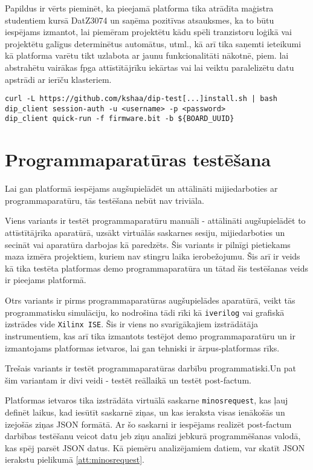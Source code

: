 Papildus ir vērts pieminēt, ka pieejamā platforma tika atrādīta maģistra
studentiem kursā DatZ3074 un saņēma pozitīvas atsauksmes, ka to būtu iespējams
izmantot, lai piemēram projektētu kādu spēli tranzistoru loģikā vai projektētu
galīgus determinētus automātus, utml., kā arī tika saņemti ieteikumi kā
platforma varētu tikt uzlabota ar jaunu funkcionalitāti nākotnē, piem. lai
abstrahētu vairākas \gls{fpga} attīstītājrīku iekārtas vai lai veiktu
paralelizētu datu apstrādi ar ierīču klasteriem. 

\begin{lstlisting}[caption={Platformas klienta lietošanas uzsākšana},label={lst:setup},captionpos=b]
curl -L https://github.com/kshaa/dip-test[...]install.sh | bash
dip_client session-auth -u <username> -p <password>
dip_client quick-run -f firmware.bit -b ${BOARD_UUID}
\end{lstlisting}

\section{Programmaparatūras testēšana}
\label{sec:testing}

Lai gan platformā iespējams augšupielādēt un attālināti mijiedarboties ar
programmaparatūru, tās testēšana nebūt nav triviāla.

Viens variants ir testēt programmaparatūru manuāli - attālināti augšupielādēt to
attīstītājrīka aparatūrā, uzsākt virtuālās saskarnes sesiju, mijiedarboties un
secināt vai aparatūra darbojas kā paredzēts. Šis variants ir pilnīgi pietiekams
maza izmēra projektiem, kuriem nav stingru laika ierobežojumu. Šis arī ir veids
kā tika testēta platformas demo programmaparatūra un tātad šis testēšanas veids
ir pieejams platformā.

Otrs variants ir pirms programmaparatūras augšupielādes aparatūrā, veikt tās
programmatisku simulāciju, ko nodrošina tādi rīki kā \lstinline!iverilog! vai
grafiskā izstrādes vide \lstinline!Xilinx ISE!. Šis ir viens no
svarīgākajiem izstrādātāja instrumentiem, kas arī tika izmantots testējot demo
programmaparatūru un ir izmantojams platformas ietvaros, lai gan tehniski ir
ārpus-platformas rīks.

Trešais variants ir testēt programmaparatūras darbību programmatiski.Un pat šim
variantam ir divi veidi - testēt reāllaikā un testēt post-factum. 

Platformas ietvaros tika izstrādāta virtuālā saskarne \lstinline!minosrequest!,
kas ļauj definēt laikus, kad iesūtīt saskarnē ziņas, un kas ieraksta visas
ienākošās un izejošās ziņas JSON formātā. Ar šo saskarni ir iespējams realizēt
post-factum darbības testēšanu veicot datu jeb ziņu analīzi jebkurā
programmēšanas valodā, kas spēj parsēt JSON datus. Kā piemēru analizējamiem
datiem, var skatīt JSON ierakstu pielikumā \ref{att:minosrequest}.

